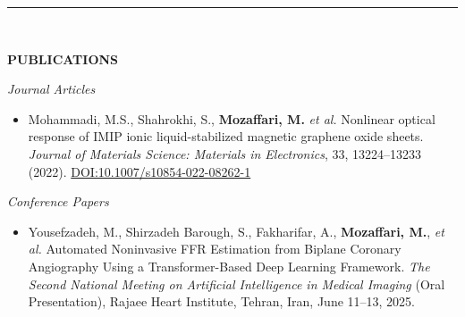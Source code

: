 \documentclass[12pt, b4paper]{cv}
\begin{document}



	


\vspace{-0.15in}
\rule{\textwidth}{1pt}\\
\vspace{-0.15in}

{\Large \textbf{PUBLICATIONS}}
\vspace{5pt}

\textit{Journal Articles}
\begin{itemize}
\item Mohammadi, M.S., Shahrokhi, S., \textbf{Mozaffari, M.} \textit{et al.}
    Nonlinear optical response of IMIP ionic liquid-stabilized magnetic graphene oxide sheets.
    \textit{Journal of Materials Science: Materials in Electronics}, 33, 13224–13233 (2022).
    \href{https://doi.org/10.1007/s10854-022-08262-1}{DOI:10.1007/s10854-022-08262-1}

\end{itemize}

\textit{Conference Papers}
\begin{itemize}
    \item Yousefzadeh, M., Shirzadeh Barough, S., Fakharifar, A., \textbf{Mozaffari, M.}, \textit{et al.}
    Automated Noninvasive FFR Estimation from Biplane Coronary Angiography Using a Transformer-Based Deep Learning Framework.
    \textit{The Second National Meeting on Artificial Intelligence in Medical Imaging} (Oral Presentation), Rajaee Heart Institute, Tehran, Iran, June 11–13, 2025.
\end{itemize}
\end{document}
